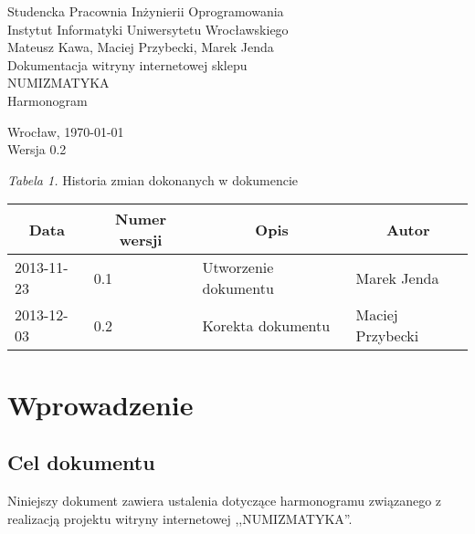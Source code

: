 \documentclass 	[11pt, a4paper, leqno]	{article}					%
\begin{document}

\begin{center}
	\thispagestyle{empty} 							%
	{\large Studencka Pracownia Inżynierii Oprogramowania} 		\\ [0.5cm]
	{\large Instytut Informatyki Uniwersytetu Wrocławskiego} 	\\ [6.0cm]

	{\large Mateusz Kawa, Maciej Przybecki, Marek Jenda} 		\\ [1.5cm]

	{\huge Dokumentacja witryny internetowej sklepu} 			\\ [0.5cm]
	{\huge NUMIZMATYKA} 										\\ [1.5cm]

	{\large Harmonogram} 										\\ [0.5cm]

	\vfill
	
	{\large Wrocław, \today}									\\ [0.5cm]
	{\large Wersja 0.2}
\end{center}

\newpage


\textit{Tabela 1.} Historia zmian dokonanych w dokumencie

\begin{center}
	\begin{tabular}{| l | l | l | l |}
		\hline
		\multicolumn{1}{|c|}{Data} & 
		\multicolumn{1}{|c|}{Numer wersji} &  
		\multicolumn{1}{|c|}{Opis} &
		\multicolumn{1}{|c|}{Autor} \\ \hline \hline
		2013-11-23 & 0.1 & Utworzenie dokumentu & Marek Jenda \\ \hline
		2013-12-03 & 0.2 & Korekta dokumentu  & Maciej Przybecki \\ \hline
	\end{tabular}
\end{center}

\newpage


\tableofcontents

\newpage

\section{Wprowadzenie}

\subsection{Cel dokumentu}
\noindent
Niniejszy dokument zawiera ustalenia dotyczące harmonogramu związanego z realizacją projektu witryny internetowej ,,NUMIZMATYKA''.
\end{document}
